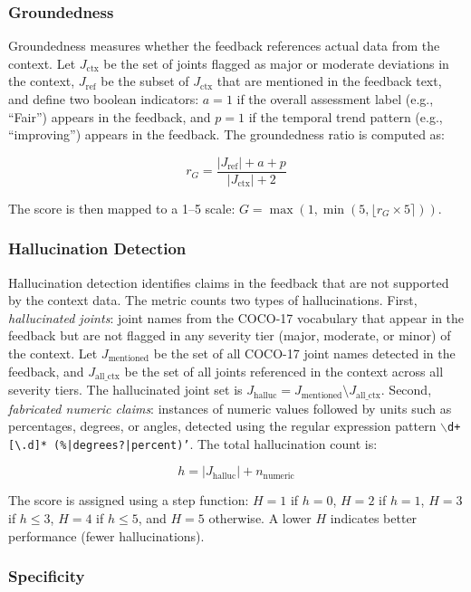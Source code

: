 \subsubsection{Groundedness}

Groundedness measures whether the feedback references actual data from the context. Let $J_{\text{ctx}}$ be the set of joints flagged as major or moderate deviations in the context, $J_{\text{ref}}$ be the subset of $J_{\text{ctx}}$ that are mentioned in the feedback text, and define two boolean indicators: $a = 1$ if the overall assessment label (e.g., ``Fair'') appears in the feedback, and $p = 1$ if the temporal trend pattern (e.g., ``improving'') appears in the feedback. The groundedness ratio is computed as:

\[
r_G = \frac{|J_{\text{ref}}| + a + p}{|J_{\text{ctx}}| + 2}
\]

The score is then mapped to a 1--5 scale: $G = \max(1, \min(5, \lfloor r_G \times 5 \rceil))$.


\subsubsection{Hallucination Detection}

Hallucination detection identifies claims in the feedback that are not supported by the context data. The metric counts two types of hallucinations. First, \textit{hallucinated joints}: joint names from the COCO-17 vocabulary that appear in the feedback but are not flagged in any severity tier (major, moderate, or minor) of the context. Let $J_{\text{mentioned}}$ be the set of all COCO-17 joint names detected in the feedback, and $J_{\text{all\_ctx}}$ be the set of all joints referenced in the context across all severity tiers. The hallucinated joint set is $J_{\text{halluc}} = J_{\text{mentioned}} \setminus J_{\text{all\_ctx}}$. Second, \textit{fabricated numeric claims}: instances of numeric values followed by units such as percentages, degrees, or angles, detected using the regular expression pattern \texttt{$\backslash$d+[\textbackslash.d]* (\%|degrees?|percent)'}. The total hallucination count is:

\[
h = |J_{\text{halluc}}| + n_{\text{numeric}}
\]

The score is assigned using a step function: $H = 1$ if $h = 0$, $H = 2$ if $h = 1$, $H = 3$ if $h \leq 3$, $H = 4$ if $h \leq 5$, and $H = 5$ otherwise. A lower $H$ indicates better performance (fewer hallucinations).


\subsubsection{Specificity}

